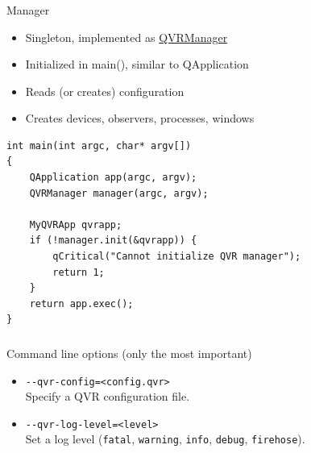 \documentclass[utf8,stillsansserifmath,fleqn,t]{beamer}
\newcommand{\code}[1]{\texttt{#1}}
\begin{document}
\begin{frame}[fragile]
\frametitle{\insertsection}
Manager
\begin{itemize}
\item Singleton, implemented as \href{https://marlam.de/qvr/libqvr-reference/class_q_v_r_manager.html}{QVRManager}
\item Initialized in main(), similar to QApplication
\item Reads (or creates) configuration
\item Creates devices, observers, processes, windows
\end{itemize}
\begin{lstlisting}
int main(int argc, char* argv[])
{
    QApplication app(argc, argv);
    QVRManager manager(argc, argv);

    MyQVRApp qvrapp;
    if (!manager.init(&qvrapp)) {
        qCritical("Cannot initialize QVR manager");
        return 1;
    }
    return app.exec();
}
\end{lstlisting}
\end{frame}

\begin{frame}
\frametitle{\insertsection}
Command line options (only the most important)
\begin{itemize}
\item \code{-{}-qvr-config=<config.qvr>}\\
      Specify a QVR configuration file.
\item \code{-{}-qvr-log-level=<level>}\\
      Set a log level (\code{fatal}, \code{warning}, \code{info}, \code{debug},
      \code{firehose}).
\end{itemize}
\end{frame}
\end{document}
